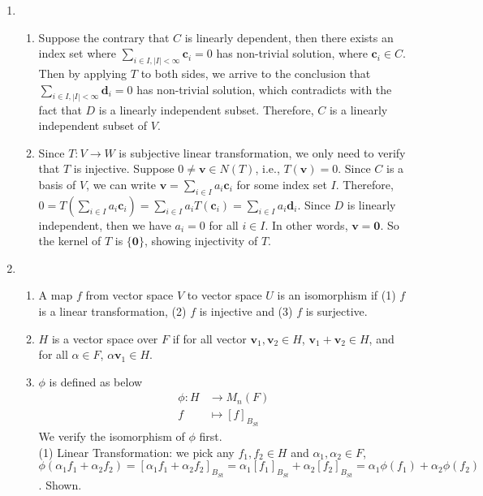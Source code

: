 \documentclass[12pt]{article}
\theoremstyle{definition}
\begin{document}
\begin{enumerate}
\begin{enumerate}
        \end{enumerate}
  \item \begin{enumerate}
          \item Suppose the contrary that $C$ is linearly dependent, then there exists an index set where $\sum_{i\in I, |I|<\infty} \mathbf{c}_i=0$ has non-trivial solution, where $\mathbf{c}_i\in C$. Then by applying $T$ to both sides, we arrive to the conclusion that $\sum_{i\in I, |I|<\infty }\mathbf{d}_i=0$ has non-trivial solution, which contradicts with the fact that $D$ is a linearly independent subset. Therefore, $C$ is a linearly independent subset of $V$.
          \item Since $T:V\to W$ is subjective linear transformation, we only need to verify that $T$ is injective. Suppose $0\neq \mathbf{v}\in N(T)$, i.e., $T(\mathbf{v})=0$. Since $C$ is a basis of $V$, we can write $\mathbf{v}=\sum_{i\in I} a_i\mathbf{c}_i$ for some index set $I$. Therefore, $0=T(\sum_{i\in I} a_i\mathbf{c}_i)=\sum_{i\in I}a_iT(\mathbf{c}_i)=\sum_{i\in I}a_i\mathbf{d}_i$. Since $D$ is linearly independent, then we have $a_i=0$ for all $i\in I$. In other words, $\mathbf{v}=\mathbf{0}$. So the kernel of $T$ is $\{\mathbf{0}\}$, showing injectivity of $T$.
        \end{enumerate}
  \item \begin{enumerate}
          \item A map $f$ from vector space $V$ to vector space $U$ is an isomorphism if (1) $f$ is a linear transformation, (2) $f$ is injective and (3) $f$ is surjective. 
          \item $H$ is a vector space over $F$ if for all vector $\mathbf{v}_1, \mathbf{v}_2\in H$, $\mathbf{v}_1+\mathbf{v}_2\in H$, and for all $\alpha\in F$, $\alpha \mathbf{v}_1\in H$.
          \item $\phi$ is defined as below
          \begin{align*}
\phi: H&\to M_n(F)\\
      f&\mapsto [f]_{B_{St}}
          \end{align*}
          We verify the isomorphism of $\phi$ first. \\
          (1) Linear Transformation: we pick any $f_1, f_2\in H$ and $\alpha_1,\alpha_2\in F$, $\phi(\alpha_1f_1+\alpha_2f_2)=[\alpha_1f_1+\alpha_2f_2]_{B_{St}}=\alpha_1[f_1]_{B_{St}}+\alpha_2[f_2]_{B_{St}}=\alpha_1\phi(f_1)+\alpha_2\phi(f_2)$. Shown.\\

\end{enumerate}
\end{enumerate}
\end{document}
